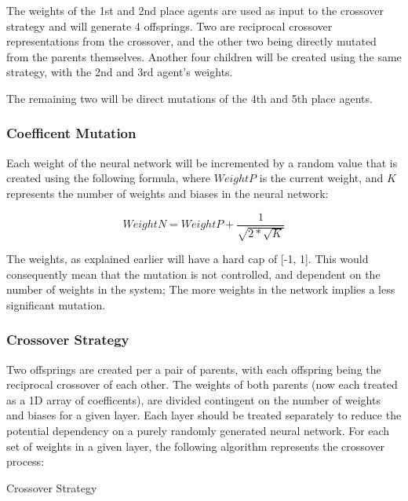 \documentclass[12pt,a4paper]{article}
\makeatletter
\def\BState{\State\hskip-\ALG@thistlm}
\makeatother
\begin{document}
The weights of the 1st and 2nd place agents are used as input to the crossover strategy and will generate 4 offsprings. Two are reciprocal crossover representations from the crossover, and the other two being directly mutated from the parents themselves. Another four children will be created using the same strategy, with the 2nd and 3rd agent's weights. 

The remaining two will be direct mutations of the 4th and 5th place agents.

\subsubsection{Coefficent Mutation}

Each weight of the neural network will be incremented by a random value that is created using the following formula, where $WeightP$ is the current weight, and $K$ represents the number of weights and biases in the neural network:

$$ WeightN = WeightP + \frac{1}{\sqrt{2 * \sqrt{K} }}$$

The weights, as explained earlier will have a hard cap of [-1, 1]. This would consequently mean that the mutation is not controlled, and dependent on the number of weights in the system; The more weights in the network implies a less significant mutation.

\subsubsection{Crossover Strategy}

Two offsprings are created per a pair of parents, with each offspring being the reciprocal crossover of each other. The weights of both parents (now each treated as a 1D array of coefficents), are divided contingent on the number of weights and biases for a given layer. Each layer should be treated separately to reduce the potential dependency on a purely randomly generated neural network. For each set of weights in a given layer, the following algorithm represents the crossover process:

\begin{algorithm}
    \caption{Crossover Strategy}
\end{algorithm}
\end{document}
